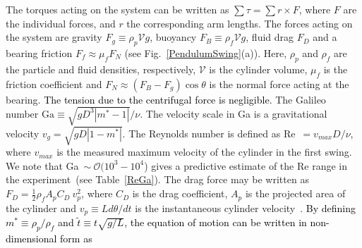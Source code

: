 \documentclass{jfm}
\begin{document}
The torques acting on the system can be written as $\sum {\tau} = \sum {r} \times {F}$, where ${F}$ are the individual forces, and ${r}$ the corresponding arm lengths. The forces acting on the system are gravity $F_g \equiv \rho_p \mathcal{V} g$, buoyancy $F_B \equiv \rho_f \mathcal{V} g$, fluid drag $F_D$ and a bearing friction $F_f \approx \mu_f F_N$ (see Fig.~\ref{PendulumSwing}(a)). Here, $\rho_p$ and $\rho_f$ are the particle and fluid densities, respectively, $\mathcal{V}$ is the cylinder volume, $\mu_f$ is the friction coefficient and $F_N \approx (F_B - F_g) \cos \theta$ is the normal force acting at the bearing. \textcolor{black}{The tension due to the centrifugal force is negligible.} {The Galileo number $\text{Ga} \equiv \sqrt{g D^3 |m^*-1|}/\nu$. The velocity scale in Ga is a gravitational  velocity $v_g = \sqrt{gD |1-m^*|}$. The Reynolds number is defined as Re~$ = v_{max} D/\nu$, where $v_{max}$ is the measured maximum velocity of the cylinder in the first swing. We note that Ga~$\sim~\mathcal{O}(10^3 - 10^4$) gives a predictive estimate of the Re range in the experiment~(see Table~\ref{ReGa}).} 
The drag force may be written as $F_D  = \frac{1}{2}\rho_f A_p C_D \ v_p^2$, where $C_D$ is the drag coefficient, $A_p$ is the projected area of the cylinder and $v_p \equiv  L d\theta /dt$ is the instantaneous cylinder velocity~\citep{batchelor2000introduction}. \textcolor{black}{By defining $m^* \equiv \rho_p/\rho_f$ and $\tilde{t} \equiv t\sqrt{g/L}$, the equation of motion can be written in non-dimensional form as}


\end{document}
